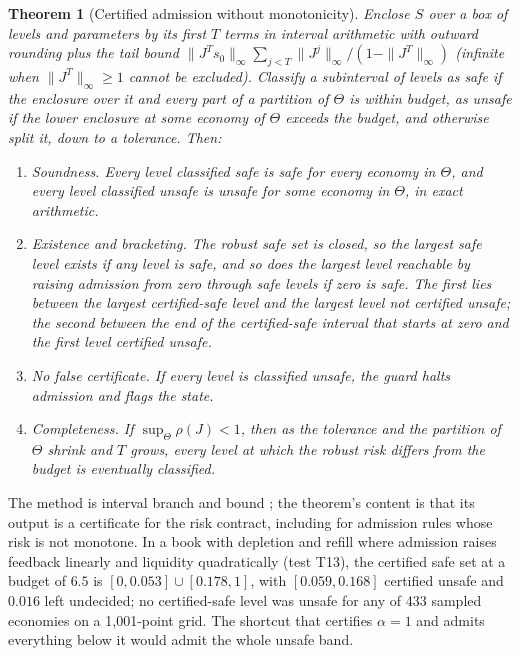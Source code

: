 \documentclass[12pt]{article}
\newtheorem{theorem}{Theorem}[section]
\theoremstyle{definition}
\theoremstyle{remark}
\begin{document}
\begin{theorem}[Certified admission without monotonicity]\label{thm:venuebb}
Enclose $S$ over a box of levels and parameters by its first $T$ terms in interval arithmetic with outward rounding plus the tail bound $\|J^Ts_0\|_\infty\sum_{j<T}\|J^j\|_\infty/(1-\|J^T\|_\infty)$ (infinite when $\|J^T\|_\infty\ge1$ cannot be excluded). Classify a subinterval of levels as safe if the enclosure over it and every part of a partition of $\Theta$ is within budget, as unsafe if the lower enclosure at some economy of $\Theta$ exceeds the budget, and otherwise split it, down to a tolerance. Then:
\begin{enumerate}[label=(\roman*)]
\item \emph{Soundness.} Every level classified safe is safe for every economy in $\Theta$, and every level classified unsafe is unsafe for some economy in $\Theta$, in exact arithmetic.
\item \emph{Existence and bracketing.} The robust safe set is closed, so the largest safe level exists if any level is safe, and so does the largest level reachable by raising admission from zero through safe levels if zero is safe. The first lies between the largest certified-safe level and the largest level not certified unsafe; the second between the end of the certified-safe interval that starts at zero and the first level certified unsafe.
\item \emph{No false certificate.} If every level is classified unsafe, the guard halts admission and flags the state.
\item \emph{Completeness.} If $\sup_\Theta\rho(J)<1$, then as the tolerance and the partition of $\Theta$ shrink and $T$ grows, every level at which the robust risk differs from the budget is eventually classified.
\end{enumerate}
\end{theorem}

The method is interval branch and bound \citep{hansen2004}; the theorem's content is that its output is a certificate for the risk contract, including for admission rules whose risk is not monotone. In a book with depletion and refill where admission raises feedback linearly and liquidity quadratically (test T13), the certified safe set at a budget of $6.5$ is $[0,0.053]\cup[0.178,1]$, with $[0.059,0.168]$ certified unsafe and $0.016$ left undecided; no certified-safe level was unsafe for any of 433 sampled economies on a 1{,}001-point grid. The shortcut that certifies $\alpha=1$ and admits everything below it would admit the whole unsafe band.
\end{document}

